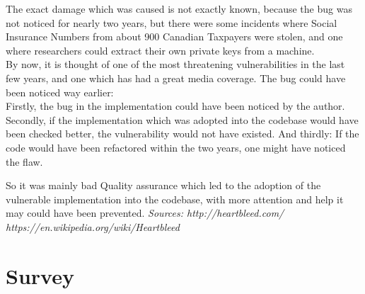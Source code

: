 \documentclass{scrartcl}
\begin{document}
The exact damage which was caused is not exactly known, because the bug was not noticed for nearly two years, but there were some incidents where
Social Insurance Numbers from about 900 Canadian Taxpayers were stolen, and one where researchers could extract their own private keys from a machine.\\
By now, it is thought of one of the most threatening vulnerabilities in the last few years, and one which has had a great media coverage.
The bug could have been noticed way earlier:\\
Firstly, the bug in the implementation could have been noticed by the author.
Secondly, if the implementation which was adopted into the codebase would have been checked better, the vulnerability would not have existed.
And thirdly: If the code would have been refactored within the two years, one might have noticed the flaw.

So it was mainly bad Quality assurance which led to the adoption of the vulnerable implementation into the codebase, with more attention and help it may could have been prevented.
\em Sources: http://heartbleed.com/ \hspace{1cm} https://en.wikipedia.org/wiki/Heartbleed
\em 
\section*{Survey}
\end{document}
